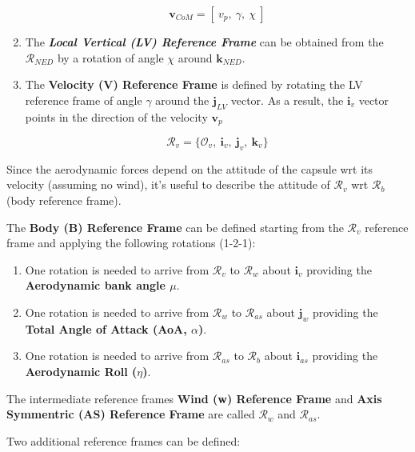 \begin{enumerate}
         $$
            \textbf{v}_{CoM} = [\: v_{p},\:\gamma,\:\chi \:]
         $$

      \item The \textbf{\textit{Local Vertical (LV) Reference Frame}} can be obtained from
         the $\mathcal{R}_{NED}$ by a rotation of angle $\chi$ around $\textbf{k}_{NED}$.

      \item The \textbf{Velocity (V) Reference Frame} is defined by rotating the LV reference frame
         of angle $\gamma$ around the $\textbf{j}_{LV}$ vector. As a result, the $\textbf{i}_{v}$ vector points
         in the direction of the velocity $\textbf{v}_{p}$

         $$\mathcal{R}_{v}=\{ \mathcal{O}_{v},\: \textbf{i}_{v},\:\textbf{j}_{v},\: \textbf{k}_{v} \}$$
   \end{enumerate}

   \vspace{0.5cm}

   Since the aerodynamic forces depend on the attitude of the capsule wrt its velocity (assuming no wind), it's
   useful to describe the attitude of $\mathcal{R}_{v}$ wrt $\mathcal{R}_{b}$ (body reference frame).

   The \textbf{Body (B) Reference Frame} can be defined starting from the $\mathcal{R}_{v}$ reference frame and
   applying the following rotations (1-2-1):

   \begin{enumerate}
      \item One rotation is needed to arrive from $\mathcal{R}_v$ to $\mathcal{R}_w$ about $\textbf{i}_v$ providing
         the \textbf{Aerodynamic bank angle $\mu$}.
      \item One rotation is needed to arrive from $\mathcal{R}_w$ to $\mathcal{R}_{as}$ about $\textbf{j}_w$ providing
         the \textbf{Total Angle of Attack (AoA, $\alpha$)}.
      \item One rotation is needed to arrive from $\mathcal{R}_{as}$ to $\mathcal{R}_{b}$ about $\textbf{i}_{as}$ providing
         the \textbf{Aerodynamic Roll ($\eta$)}.
   \end{enumerate}

   The intermediate reference frames \textbf{Wind (w) Reference Frame} and \textbf{Axis Symmentric (AS) Reference Frame} are called
   $\mathcal{R}_w$ and $\mathcal{R}_{as}$.

   Two additional reference frames can be defined:

